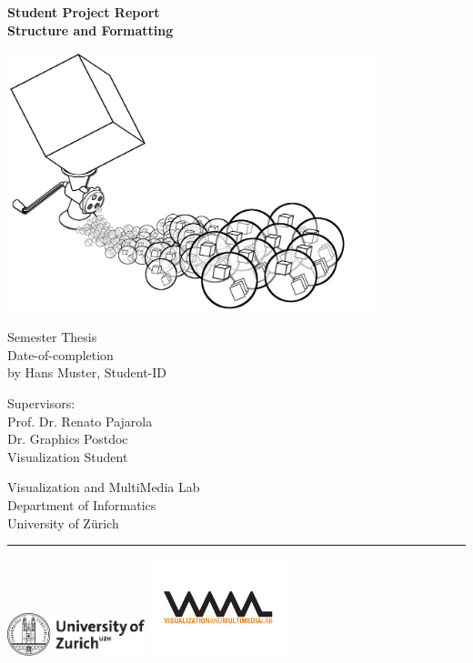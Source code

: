 \documentclass[11pt, a4paper,oneside,chapterprefix=false]{scrbook}
\begin{document}
\frontmatter
\begin{titlepage}
	\setlength{\parindent}{0cm}
	\addtolength{\textheight}{1.0cm}

	\vspace{0.5cm}
	\Huge
	{\textbf \textsf{Student Project Report \\ Structure and Formatting}}

	\vfill \vfill \vfill
	\includegraphics*[width=0.8\textwidth]{figures/titleimage}

	\vfill
	\textsf\Large
	Semester Thesis \\
	Date-of-completion \\[0.5cm]
	\large
	by Hans Muster, Student-ID

	\vfill \vfill \vfill
	\begin{minipage}[b]{0.5\textwidth}
	Supervisors: \\
	Prof. Dr. Renato Pajarola \\
	Dr. Graphics Postdoc \\
	Visualization Student
	\end{minipage}
	\begin{minipage}[b]{0.5\textwidth} \raggedleft
	Visualization and MultiMedia Lab \\
	Department of Informatics \\
	University of Z{\"u}rich
	\end{minipage}

	\vfill
	\hrule
	\vspace{0.5cm}
	\includegraphics*[width=0.3\textwidth]{figures/uzh_logo} \hfill
	\includegraphics*[width=0.3\textwidth]{figures/vmml_logo}
\end{titlepage}
\end{document}
